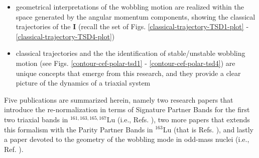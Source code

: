 \begin{itemize}
    \item geometrical interpretations of the wobbling motion are realized within the space generated by the angular momentum components, showing the classical trajectories of the $\mathbf{I}$ (recall the set of Figs. \ref{classical-trajectory-TSD1-plot} - \ref{classical-trajectory-TSD4-plot})
    \item classical trajectories and the the identification of stable/unstable wobbling motion (see Figs. \ref{contour-cef-polar-tsd1} - \ref{contour-cef-polar-tsd4}) are unique concepts that emerge from this research, and they provide a clear picture of the dynamics of a triaxial system
\end{itemize}

Five publications are summarized herein, namely two research papers that introduce the re-normalization in terms of Signature Partner Bands for the first two triaxial bands in $^{161,163,165,167}$Lu (i.e., Refs. \cite{raduta2020approach,raduta2020towards}), two more papers that extends this formalism with the Parity Partner Bands in $^{163}$Lu (that is Refs. \cite{poenaru2021parity,poenaru2021extensive1}), and lastly a paper devoted to the geometry of the wobbling mode in odd-mass nuclei (i.e., Ref. \cite{poenaru2021extensive2}).